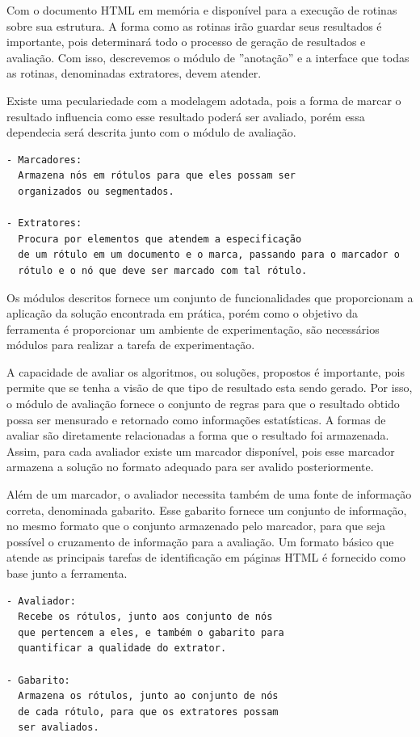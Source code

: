 \documentclass[12pt, a4paper]{article}
\begin{document}
Com o documento HTML em memória e disponível para a execução de rotinas
sobre sua estrutura. A forma como as rotinas irão guardar seus resultados
é importante, pois determinará todo o processo de geração de resultados
e avaliação. Com isso, descrevemos o módulo de ''anotação'' e a interface
que todas as rotinas, denominadas extratores, devem atender.

Existe uma peculariedade com a modelagem adotada, pois a forma de marcar
o resultado influencia como esse resultado poderá ser avaliado, porém
essa dependecia será descrita junto com o módulo de avaliação.

\begin{verbatim}
- Marcadores:
  Armazena nós em rótulos para que eles possam ser
  organizados ou segmentados.

- Extratores:
  Procura por elementos que atendem a especificação
  de um rótulo em um documento e o marca, passando para o marcador o
  rótulo e o nó que deve ser marcado com tal rótulo.
\end{verbatim}

Os módulos descritos fornece um conjunto de
funcionalidades que proporcionam a aplicação da solução encontrada em
prática, porém como o objetivo da ferramenta é proporcionar um ambiente
de experimentação, são necessários módulos para realizar a tarefa de experimentação.

A capacidade de avaliar os algoritmos, ou soluções, propostos é
importante, pois permite que se tenha a visão de que tipo de resultado
esta sendo gerado. Por isso, o módulo de avaliação fornece o conjunto de
regras para que o resultado obtido possa ser mensurado e retornado como
informações estatísticas. A formas de avaliar são diretamente
relacionadas a forma que o resultado foi armazenada. Assim, para cada
avaliador existe um marcador disponível, pois esse marcador armazena a
solução no formato adequado para ser avalido posteriormente.


Além de um marcador, o avaliador necessita também de uma fonte de
informação correta, denominada gabarito. Esse gabarito fornece um
conjunto de informação, no mesmo formato que o conjunto armazenado pelo
marcador, para que seja possível o cruzamento de informação para a
avaliação. Um formato básico que atende as principais tarefas de
identificação em páginas HTML é fornecido como base junto a ferramenta.

\begin{verbatim}
- Avaliador:
  Recebe os rótulos, junto aos conjunto de nós
  que pertencem a eles, e também o gabarito para
  quantificar a qualidade do extrator.

- Gabarito: 
  Armazena os rótulos, junto ao conjunto de nós
  de cada rótulo, para que os extratores possam
  ser avaliados.
\end{verbatim}
\end{document}
